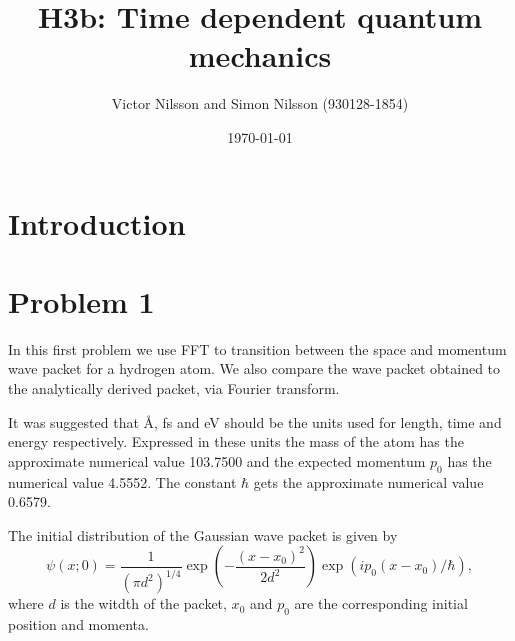 



\title{H3b: Time dependent quantum mechanics}
\author{Victor Nilsson and Simon Nilsson (930128-1854)}
\date{\today}





\section*{Introduction}

\section*{Problem 1}

In this first problem we use FFT to transition between the space and momentum wave packet for a hydrogen atom. We also compare the wave packet obtained to the analytically derived packet, via Fourier transform.

It was suggested that \AA, fs and eV should be the units used for length, time and energy respectively. Expressed in these units the mass of the atom has the approximate numerical value 103.7500 and the expected momentum $p_0$ has the numerical value 4.5552. The constant $\hbar$ gets the approximate numerical value 0.6579.

The initial distribution of the Gaussian wave packet is given by
\begin{equation}
	\psi(x;0)=\frac{1}{(\pi d^2)^{1/4}} \exp(-\frac{(x-x_0)^2}{2d^2}) \exp(i p_0(x-x_0)/\hbar),
\end{equation}
where $d$ is the witdth of the packet, $x_0$ and $p_0$ are the corresponding initial position and momenta.






